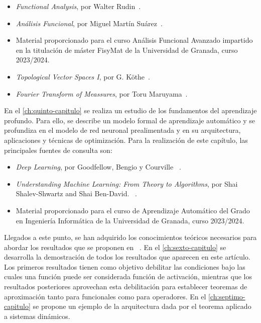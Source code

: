 \begin{itemize}
    \item \emph{Functional Analysis}, por Walter Rudin~\cite{rudin1991functional}.
    \item \emph{Análisis Funcional}, por Miguel Martín Suárez~\cite{martin2011analisis}.
    \item Material proporcionado para el curso Análisis Funcional Avanzado impartido en la titulación de máster FisyMat de la Universidad de Granada, curso 2023/2024.
    \item \emph{Topological Vector Spaces I}, por  G. Köthe~\cite{kothe1979topological}.
    \item \emph{Fourier Transform of Meassures}, por Toru Maruyama~\cite{Maruyama2018}.

     
    
\end{itemize}



En el \autoref{ch:quinto-capitulo} se realiza un estudio de los fundamentos del aprendizaje profundo. Para ello, se describe un modelo formal de  aprendizaje automático y se profundiza en el modelo de red neuronal prealimentada y en su arquitectura, aplicaciones y técnicas de optimización. Para la realización de este capítulo, las principales fuentes de consulta son: 

\begin{itemize}
    \item \emph{Deep Learning}, por Goodfellow, Bengio y Courville ~\cite{goodfellow2016deep}.
    \item \emph{Understanding Machine Learning: From Theory to Algorithms}, por Shai Shalev-Shwartz and Shai Ben-David. ~\cite{shalev-shwartz2014understanding}.
    \item Material proporcionado para el curso de Aprendizaje Automático del Grado en Ingeniería Informática de la Universidad de Granada, curso 2023/2024. 

    
\end{itemize}

  
Llegados a este punto, se han adquirido los conocimientos teóricos necesarios para abordar los resultados que se proponen en ~\cite{chen1995universal}. En el \autoref{ch:sexto-capitulo} se desarrolla la demostración de todos los resultados que aparecen en este artículo. Los primeros resultados tienen como objetivo debilitar las condiciones bajo las cuales una función puede ser considerada función de activación, mientras que los resultados posteriores aprovechan esta debilitación para establecer teoremas de aproximación tanto para funcionales como para operadores. En el \autoref{ch:septimo-capitulo} se propone un ejemplo de la arquitectura dada por el teorema aplicado a sistemas dinámicos. 

